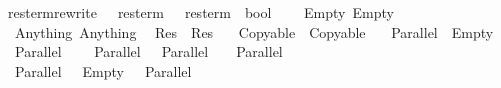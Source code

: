 \isamarkupfalse%
\ res{\isacharunderscore}term{\isacharunderscore}rewrite\ {\isacharcolon}{\isacharcolon}\ {\isachardoublequoteopen}\ res{\isacharunderscore}term\ {\isasymRightarrow}\ \ res{\isacharunderscore}term\ {\isasymRightarrow}\ bool{\isachardoublequoteclose}\ \isanewline
\ \ {\isachardoublequoteopen}\ Empty\ Empty{\isachardoublequoteclose}\isanewline
{\isacharbar}\ {\isachardoublequoteopen}\ Anything\ Anything{\isachardoublequoteclose}\isanewline
{\isacharbar}\ {\isachardoublequoteopen}\ {\isacharparenleft}Res\ \ {\isacharparenleft}Res\ \isanewline
{\isacharbar}\ {\isachardoublequoteopen}\ {\isacharparenleft}Copyable\ \ {\isacharparenleft}Copyable\ \isanewline
{\isacharbar}\ {\isachardoublequoteopen}\ {\isacharparenleft}Parallel\ {\isacharbrackleft}{\isacharbrackright}{\isacharparenright}\ Empty{\isachardoublequoteclose}\isanewline
{\isacharbar}\ {\isachardoublequoteopen}\ {\isacharparenleft}Parallel\ {\isacharbrackleft}\ \isanewline
{\isacharbar}\ {\isachardoublequoteopen}\ {\isacharparenleft}Parallel\ {\isacharparenleft}\ {\isacharat}\ {\isacharbrackleft}Parallel\ \ {\isacharat}\ \ {\isacharparenleft}Parallel\ {\isacharparenleft}\ {\isacharat}\ \ {\isacharat}\ \isanewline
{\isacharbar}\ {\isachardoublequoteopen}\ {\isacharparenleft}Parallel\ {\isacharparenleft}\ {\isacharat}\ {\isacharbrackleft}Empty{\isacharbrackright}\ {\isacharat}\ \ {\isacharparenleft}Parallel\ {\isacharparenleft}\ {\isacharat}\ \isanewline

